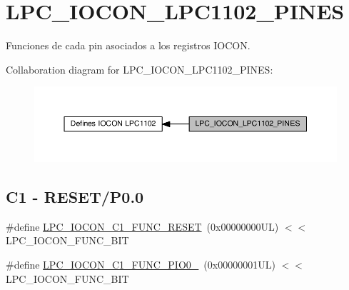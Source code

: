 \hypertarget{group___l_p_c___i_o_c_o_n___l_p_c1102___p_i_n_e_s}{}\section{L\+P\+C\+\_\+\+I\+O\+C\+O\+N\+\_\+\+L\+P\+C1102\+\_\+\+P\+I\+N\+ES}
\label{group___l_p_c___i_o_c_o_n___l_p_c1102___p_i_n_e_s}


Funciones de cada pin asociados a los registros I\+O\+C\+ON.  


Collaboration diagram for L\+P\+C\+\_\+\+I\+O\+C\+O\+N\+\_\+\+L\+P\+C1102\+\_\+\+P\+I\+N\+ES\+:\nopagebreak
\begin{figure}[H]
\begin{center}
\leavevmode
\includegraphics[width=350pt]{group___l_p_c___i_o_c_o_n___l_p_c1102___p_i_n_e_s}
\end{center}
\end{figure}
\subsection*{C1 -\/ R\+E\+S\+E\+T/\+P0.0}
\begin{DoxyCompactItemize}
\item 
\#define \hyperlink{group___l_p_c___i_o_c_o_n___l_p_c1102___p_i_n_e_s_gac743a21ae6fb018103e15efe2ea9487e}{L\+P\+C\+\_\+\+I\+O\+C\+O\+N\+\_\+\+C1\+\_\+\+F\+U\+N\+C\+\_\+\+R\+E\+S\+ET}~(0x00000000\+U\+L) $<$$<$ L\+P\+C\+\_\+\+I\+O\+C\+O\+N\+\_\+\+F\+U\+N\+C\+\_\+\+B\+IT
\item 
\#define \hyperlink{group___l_p_c___i_o_c_o_n___l_p_c1102___p_i_n_e_s_gafade20b5f097f138815526a37ea5b86e}{L\+P\+C\+\_\+\+I\+O\+C\+O\+N\+\_\+\+C1\+\_\+\+F\+U\+N\+C\+\_\+\+P\+I\+O0\+\_}~(0x00000001\+U\+L) $<$$<$ L\+P\+C\+\_\+\+I\+O\+C\+O\+N\+\_\+\+F\+U\+N\+C\+\_\+\+B\+IT
\end{DoxyCompactItemize}
